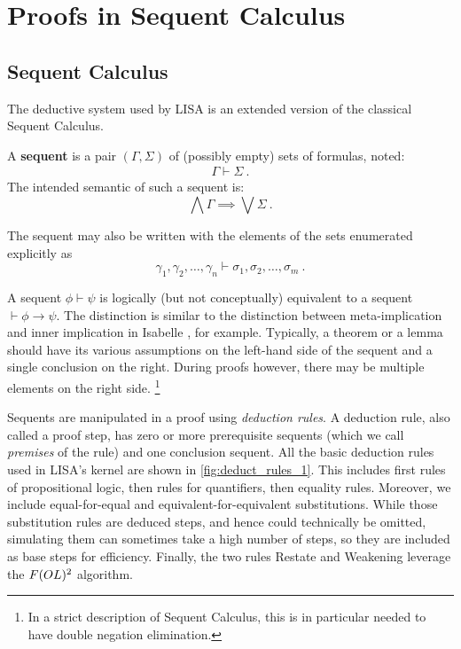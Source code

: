 \section{Proofs in Sequent Calculus}
\label{sec:proofs_lk}
\subsection{Sequent Calculus}
\label{subsec:lk}
The deductive system used by LISA is an extended version of the classical Sequent Calculus. 
%
\begin{definition}
  A \textbf{sequent} is a pair $(\Gamma, \Sigma)$ of (possibly empty) sets of formulas, noted:
  \begin{gather*}
    \Gamma \vdash \Sigma~.
  \end{gather*}
  The intended semantic of such a sequent is:
  \begin{equation*}
    \label{eq:SequentSemantic}
    \bigwedge \Gamma \implies \bigvee \Sigma~.
  \end{equation*}

  The sequent may also be written with the elements of the sets enumerated explicitly as
  \begin{equation*}
    \gamma_1, \gamma_2, \ldots, \gamma_n \vdash \sigma_1, \sigma_2, \ldots, \sigma_m~.
  \end{equation*}
\end{definition}
A sequent $\phi \vdash \psi$ is logically (but not conceptually) equivalent to a sequent $\vdash \phi \rightarrow \psi$. The distinction is similar to the distinction between meta-implication and inner implication in Isabelle \cite{paulsonIsabelleNext7001993}, for example. Typically, a theorem or a lemma should have its various assumptions on the left-hand side of the sequent and a single conclusion on the right. During proofs however, there may be multiple elements on the right side. \footnote{In a strict description of Sequent Calculus, this is in particular needed to have double negation elimination.}

Sequents are manipulated in a proof using \emph{deduction rules}. A deduction rule, also called a proof step, has zero or more prerequisite sequents (which we call \emph{premises} of the rule) and one conclusion sequent. All the basic deduction rules used in LISA's kernel are shown in \autoref{fig:deduct_rules_1}.
This includes first rules of propositional logic, then rules for quantifiers, then equality rules. Moreover, we include equal-for-equal and equivalent-for-equivalent substitutions. While those substitution rules are deduced steps, and hence could technically be omitted, simulating them can sometimes take a high number of steps, so they are included as base steps for efficiency.
Finally, the two rules Restate and Weakening leverage the $F(OL)\textsuperscript{2}$ algorithm.

